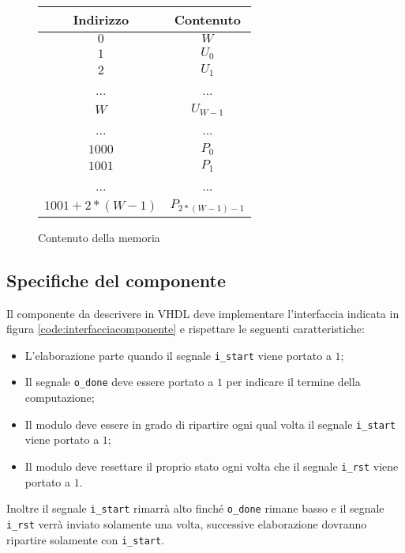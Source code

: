 \begin{figure}[!ht]
    \centering
    \begin{tabular}{c | c}
        Indirizzo      & Contenuto       \\
        \hline
        $0$            & $W$             \\
        $1$            & $U_0$           \\
        $2$            & $U_1$           \\
        ...            & ...             \\
        $W$            & $U_{W-1}$       \\
        ...            & ...             \\
        $1000$         & $P_{0}$         \\
        $1001$         & $P_{1}$         \\
        ...            & ...             \\
        $1001+2*(W-1)$ & $P_{2*(W-1)-1}$ \\
    \end{tabular}
    \caption{Contenuto della memoria}
    \label{table:memoria}
\end{figure}

\subsection{Specifiche del componente}

Il componente da descrivere in VHDL deve implementare l'interfaccia indicata in figura \ref{code:interfacciacomponente} e rispettare le seguenti caratteristiche:

\begin{itemize}
    \item L'elaborazione parte quando il segnale \verb|i_start| viene portato a $1$;
    \item Il segnale \verb|o_done| deve essere portato a $1$ per indicare il termine della computazione;
    \item Il modulo deve essere in grado di ripartire ogni qual volta il segnale \verb|i_start| viene portato a $1$;
    \item Il modulo deve resettare il proprio stato ogni volta che il segnale \verb|i_rst| viene portato a $1$.
\end{itemize}

Inoltre il segnale \verb|i_start| rimarrà alto finché \verb|o_done| rimane basso e il segnale \verb|i_rst| verrà inviato solamente una volta, successive elaborazione dovranno ripartire solamente con \verb|i_start|.

